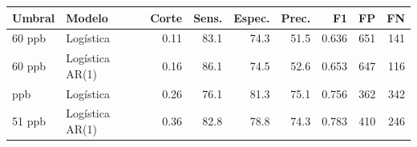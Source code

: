 \begin{tabular}{@{}llrrrrrrr@{}}
\toprule
Umbral & Modelo & Corte & Sens. & Espec. & Prec. & F1 & FP & FN \\
\midrule
60 ppb & Logística & 0.11 & 83.1 & 74.3 & 51.5 & 0.636 & 651 & 141 \\
60 ppb & Logística AR(1) & 0.16 & 86.1 & 74.5 & 52.6 & 0.653 & 647 & 116 \\
\addlinespace
51 ppb & Logística & 0.26 & 76.1 & 81.3 & 75.1 & 0.756 & 362 & 342 \\
51 ppb & Logística AR(1) & 0.36 & 82.8 & 78.8 & 74.3 & 0.783 & 410 & 246 \\
\bottomrule
\end{tabular}